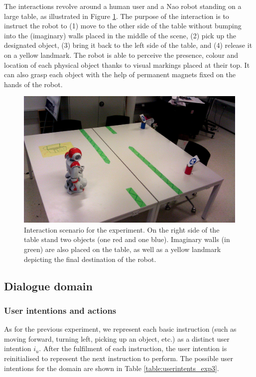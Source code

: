 The interactions revolve around a human user and a Nao robot standing on a large table, as illustrated in Figure \ref{fig:scenario}.  The purpose of the interaction is to instruct the robot to (1) move to the other side of the table without bumping into the (imaginary) walls placed in the middle of the scene, (2) pick up the designated object, (3) bring it back to the left side of the table, and (4) release it on a yellow landmark.  The robot is able to perceive the presence, colour and location of each physical object thanks to visual markings placed at their top.  It can also grasp each object with the help of permanent magnets fixed on the hands of the robot. 

\begin{figure}[h]
\vspace{3mm}
\centering
\includegraphics[scale=0.13]{imgs/scenario.jpg} \vspace{3mm}
\caption{Interaction scenario for the experiment.  On the right side of the table stand two objects (one red and one blue).  Imaginary walls (in green) are also placed on the table, as well as a yellow landmark depicting the final destination of the robot. }
\label{fig:scenario}
\end{figure}


\subsection{Dialogue domain}

\subsubsection*{User intentions and actions}

As for the previous experiment, we represent each basic instruction (such as moving forward, turning left, picking up an object, etc.) as a distinct user intention $i_u$. After the fulfilment of each instruction, the user intention is reinitialised to represent the next instruction to perform.  The possible user intentions for the domain are shown in Table \ref{table:userintents_exp3}.  

